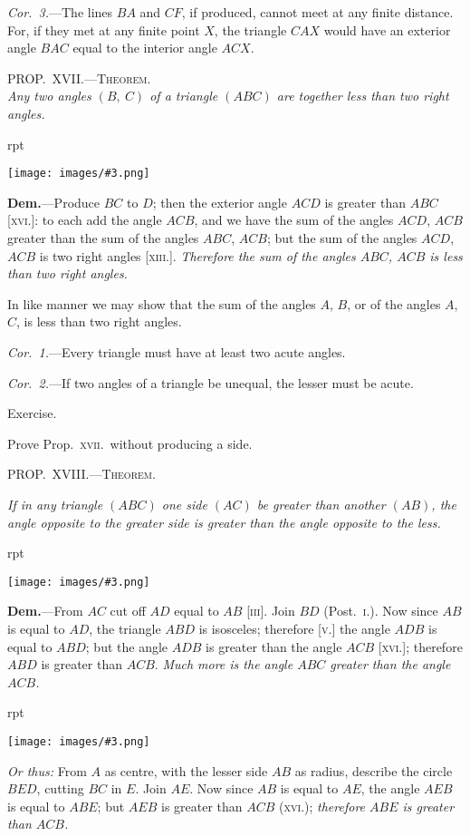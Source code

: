 \documentclass[oneside]{book}
\newcounter{wrapwidth}
\newcommand\myprop[2]{
\bigskip\Needspace*{4\baselineskip}\begin{center}\textsc{#1}\\\medskip\emph{#2}\par\end{center}
}
\newcommand\mypropl[2]{
\bigskip\Needspace*{4\baselineskip}\begin{center}\textsc{#1}\end{center}
\hspace{\parindent}\emph{#2}\par\medskip
}
\newcommand\exhead[1]{
\Needspace*{5\baselineskip}\begin{center}
\textsf{#1}
\end{center}
}
\newcommand\imgflow[3]{
\setcounter{wrapwidth}{#1}
\begin{wrapfigure}[#2]{r}{\value{wrapwidth}pt}
\begin{center}
\vspace{-0.3in}
\texttt{[image: images/\#3.png]}
\end{center}
\end{wrapfigure}
}
\begin{document}

\textit{Cor.~3.}---The lines $BA$ and $CF$, if produced, cannot
meet at any finite distance. For, if they met at any
finite point $X$, the triangle $CAX$ would have an exterior
angle $BAC$ equal to the interior angle $ACX$.


\myprop{PROP\@.~XVII\@.---Theorem.}{Any two angles $(B,\ C)$ of a triangle $(ABC)$ are together
less than two right angles.}

\imgflow{105}{7}{f032}

\textbf{Dem.}---Produce $BC$ to $D$; then the exterior angle
$ACD$ is greater than $ABC$ [\textsc{xvi.}]:
to each add the angle $ACB$, and
we have the sum of the angles
$ACD$, $ACB$ greater than the sum
of the angles $ABC$, $ACB$; but the
sum of the angles $ACD$, $ACB$ is
two right angles [\textsc{xiii.}]. \textit{Therefore
the sum of the angles $ABC$,
$ACB$ is less than two right angles.}

In like manner we may show that the sum of the
angles $A$, $B$, or of the angles $A$, $C$, is less than two
right angles.

\textit{Cor.~1.}---Every triangle must have at least two
acute angles.

\textit{Cor.~2.}---If two angles of a triangle be unequal, the
lesser must be acute.

\exhead{Exercise.}

\begin{footnotesize}
Prove Prop.~\textsc{xvii.}\ without producing a side.
\par\end{footnotesize}


\mypropl{PROP\@.~XVIII\@.---Theorem.}{If in any triangle $(ABC)$ one side $(AC)$ be greater than
another $(AB)$, the angle opposite to the greater side is
greater than the angle opposite to the less.}

\imgflow{133}{7}{f033}

\textbf{Dem.}---From $AC$ cut off $AD$ equal to $AB$ [\textsc{iii}].
Join $BD$ (Post.~\textsc{i.}). Now
since $AB$ is equal to $AD$, the
triangle $ABD$ is isosceles;
therefore [\textsc{v.}] the angle $ADB$
is equal to $ABD$; but the angle
$ADB$ is greater than the angle
$ACB$ [\textsc{xvi.}]; therefore $ABD$
is greater than $ACB$.  \textit{Much more is the angle $ABC$
greater than the angle $ACB$.}

\imgflow{133}{6}{f034}

\textit{Or thus:} From $A$ as centre,
with the lesser side $AB$ as radius,
describe the circle $BED$,
cutting $BC$ in $E$. Join $AE$.
Now since $AB$ is equal to $AE$,
the angle $AEB$ is equal to
$ABE$; but $AEB$ is greater than
$ACB$ (\textsc{xvi}.); \textit{therefore $ABE$ is greater than $ACB$.}
\end{document}
